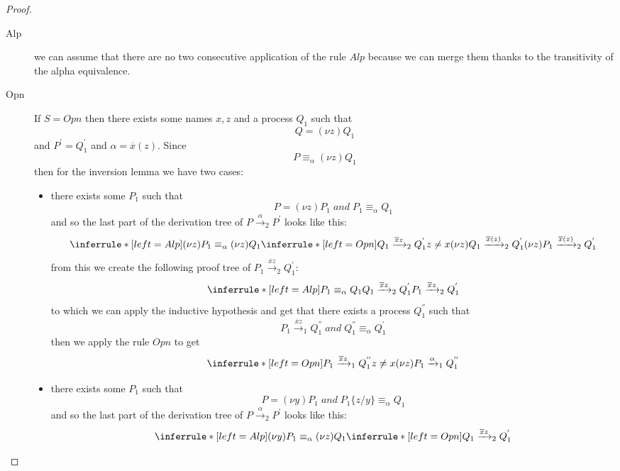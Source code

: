 \begin{theorem}
\begin{proof}
\begin{description}
\begin{description}
	  \item[Alp]
	    we can assume that there are no two consecutive application of the rule $Alp$ because we can merge them thanks to the transitivity of the alpha equivalence.
	  \item[Opn]
	    If $S=Opn$ then there exists some names $x,z$ and a process $Q_{1}$ such that 
	    \[
	      Q=(\nu z)Q_{1}
	    \]
	    and $P^{'}=Q_{1}^{'}$ and $\alpha=\overline{x}(z)$. Since 
	    \[
	      P\equiv_{\alpha}(\nu z)Q_{1}
	    \]
	    then for the inversion lemma we have two cases:
	    \begin{itemize}
	      \item 
		there exists some $P_{1}$ such that 
		\[
		  P=(\nu z)P_{1}\; and\; P_{1}\equiv_{\alpha}Q_{1}
		\]
		and so the last part of the derivation tree of $P\xrightarrow{\alpha}_{2}P^{'}$ looks like this:
		\[
		  \inferrule* [left=Alp]{
		      (\nu z)P_{1}\equiv_{\alpha}(\nu z)Q_{1}
		    \\
		      \inferrule* [left=Opn]{
			  Q_{1}\xrightarrow{\overline{x}z}_{2}Q_{1}^{'}
			\\
			  z\neq x
		      }{
			(\nu z)Q_{1}\xrightarrow{\overline{x}(z)}_{2}Q_{1}^{'}
		      }
		  }{
		    (\nu z)P_{1}\xrightarrow{\overline{x}(z)}_{2}Q_{1}^{'}
		  }
		\]
		from this we create the following proof tree of $P_{1}\xrightarrow{\overline{x}z}_{2}Q_{1}^{'}$:
		\[
		  \inferrule* [left=Alp]{
		      P_{1}\equiv_{\alpha}Q_{1}
		    \\
		      Q_{1}\xrightarrow{\overline{x}z}_{2}Q_{1}^{'}
		  }{
		    P_{1}\xrightarrow{\overline{x}z}_{2}Q_{1}^{'}
		  }		
		\]
		to which we can apply the inductive hypothesis and get that there exists a process $Q_{1}^{''}$ such that
		\[
		  P_{1}\xrightarrow{\overline{x}z}_{1}Q_{1}^{''}\;and\; Q_{1}^{''}\equiv_{\alpha}Q_{1}^{'}
		\]
		then we apply the rule $Opn$ to get
		\[
		      \inferrule* [left=Opn]{
			  P_{1}\xrightarrow{\overline{x}z}_{1}Q_{1}^{''}
			\\
			  z\neq x
		      }{
			(\nu z)P_{1}\xrightarrow{\alpha}_{1}Q_{1}^{''}
		      }		 
		\]
	      \item
		there exists some $P_{1}$ such that 
		\[
		  P=(\nu y)P_{1}\; and\; P_{1}\{z/y\}\equiv_{\alpha}Q_{1}
		\]
		and so the last part of the derivation tree of $P\xrightarrow{\alpha}_{2}P^{'}$ looks like this:
		\[
		  \inferrule* [left=Alp]{
		      (\nu y)P_{1}\equiv_{\alpha}(\nu z)Q_{1}
		    \\
		      \inferrule* [left=Opn]{
			  Q_{1}\xrightarrow{\overline{x}z}_{2}Q_{1}^{'}
			\\
}}\]
\end{itemize}
\end{description}
\end{description}
\end{proof}
\end{theorem}

